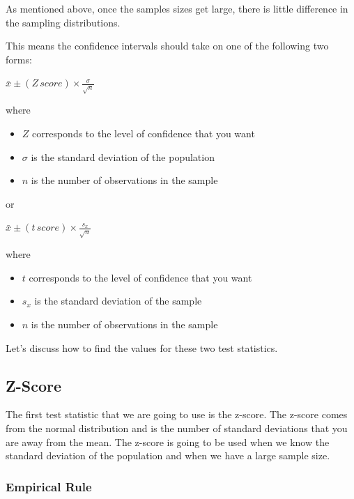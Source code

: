 \documentclass[
  letterpaper,
  DIV=11,
  numbers=noendperiod]{scrreprt}
\providecommand{\tightlist}{%
  \setlength{\itemsep}{0pt}\setlength{\parskip}{0pt}}\usepackage{longtable,booktabs,array}
\begin{document}
As mentioned above, once the samples sizes get large, there is little
difference in the sampling distributions.

This means the confidence intervals should take on one of the following
two forms:

\(\displaystyle{\bar{x} \pm (Z\,score) \times \frac{\sigma}{\sqrt{n}}}\)

where

\begin{itemize}
\tightlist
\item
  \(Z\) corresponds to the level of confidence that you want
\item
  \(\sigma\) is the standard deviation of the population
\item
  \(n\) is the number of observations in the sample
\end{itemize}

or

\(\displaystyle{\bar{x} \pm (t \, score) \times \frac{s_x}{\sqrt{n}}}\)

where

\begin{itemize}
\tightlist
\item
  \(t\) corresponds to the level of confidence that you want
\item
  \(s_x\) is the standard deviation of the sample
\item
  \(n\) is the number of observations in the sample
\end{itemize}

Let's discuss how to find the values for these two test statistics.

\subsection*{Z-Score}\label{z-score}

The first test statistic that we are going to use is the z-score. The
z-score comes from the normal distribution and is the number of standard
deviations that you are away from the mean. The z-score is going to be
used when we know the standard deviation of the population and when we
have a large sample size.

\subsubsection*{Empirical Rule}\label{empirical-rule}
\end{document}
